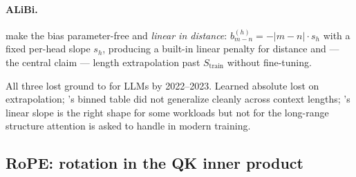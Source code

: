 \paragraph{ALiBi.} \citet[ALiBi]{press-alibi} make the bias
parameter-free and \emph{linear in distance}:
$b_{m-n}^{(h)} = -|m-n| \cdot s_h$ with a fixed per-head slope $s_h$,
producing a built-in linear penalty for distance and --- the
central claim --- length extrapolation past $S_{\text{train}}$ without
fine-tuning.

All three lost ground to  for  LLMs by 2022--2023.
Learned absolute lost on extrapolation; 's binned table did not
generalize cleanly across context lengths; 's linear slope is the
right shape for some workloads but not for the long-range structure
attention is asked to handle in modern  training.

\subsection{RoPE: rotation in the QK inner product}
\label{sec:pos-rope}

